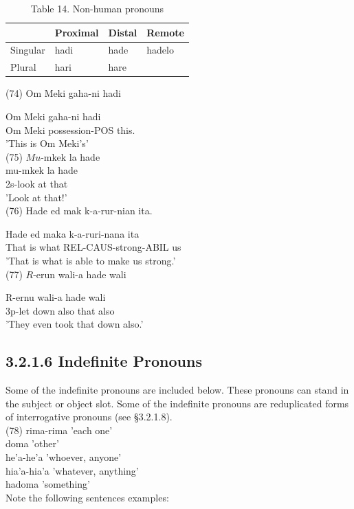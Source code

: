 \documentclass[10pt]{article}
\begin{document}
\begin{table}[h]
\begin{center}
\captionsetup{labelformat=empty}
\caption{Table 14. Non-human pronouns}
\begin{tabular}{|l|l|l|l|}
\hline
 & Proximal & Distal & Remote \\
\hline
Singular & hadi & hade & hadelo \\
\hline
Plural & hari & hare &  \\
\hline
\end{tabular}
\end{center}
\end{table}

(74) Om Meki gaha-ni hadi

Om Meki gaha-ni hadi\\
Om Meki possession-POS this.\\
'This is Om Meki's'\\
(75) \(M u\)-mkek la hade\\
mu-mkek la hade\\
2s-look at that\\
'Look at that!'\\
(76) Hade ed mak k-a-rur-nian ita.

Hade ed maka k-a-ruri-nana ita\\
That is what REL-CAUS-strong-ABIL us\\
'That is what is able to make us strong.'\\
(77) \(R\)-erun wali-a hade wali

R-ernu wali-a hade wali\\
3p-let down also that also\\
'They even took that down also.'

\subsection*{3.2.1.6 Indefinite Pronouns}
Some of the indefinite pronouns are included below. These pronouns can stand in the subject or object slot. Some of the indefinite pronouns are reduplicated forms of interrogative pronouns (see §3.2.1.8).\\
(78) rima-rima 'each one'\\
doma 'other'\\
he'a-he'a 'whoever, anyone'\\
hia'a-hia'a 'whatever, anything'\\
hadoma 'something'\\
Note the following sentences examples:
\end{document}

